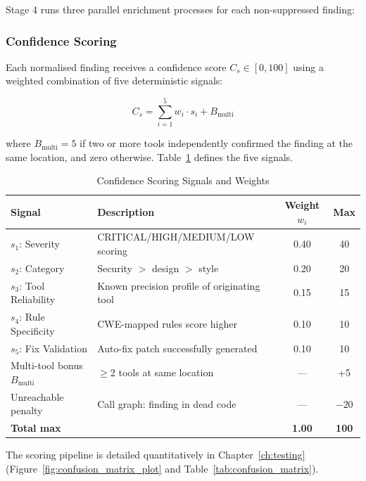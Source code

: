 Stage 4 runs three parallel enrichment processes for each non-suppressed finding:

\subsubsection{Confidence Scoring}

Each normalised finding receives a confidence score $C_s \in [0, 100]$ using a weighted combination of five deterministic signals:

\begin{equation}
  C_s = \sum_{i=1}^{5} w_i \cdot s_i + B_{\text{multi}}
  \label{eq:confidence_score}
\end{equation}

\noindent where $B_{\text{multi}} = 5$ if two or more tools independently confirmed the finding at the same location, and zero otherwise. Table~\ref{tab:confidence_signals} defines the five signals.

\begin{table}[htbp]
\caption{Confidence Scoring Signals and Weights}
\label{tab:confidence_signals}
\centering
\renewcommand{\arraystretch}{1.3}
\begin{tabularx}{\textwidth}{@{} l X c c @{}}
\toprule
\textbf{Signal} & \textbf{Description} & \textbf{Weight $w_i$} & \textbf{Max} \\
\midrule
$s_1$: Severity         & CRITICAL/HIGH/MEDIUM/LOW scoring           & 0.40 & 40 \\
$s_2$: Category         & Security $>$ design $>$ style              & 0.20 & 20 \\
$s_3$: Tool Reliability & Known precision profile of originating tool & 0.15 & 15 \\
$s_4$: Rule Specificity & CWE-mapped rules score higher              & 0.10 & 10 \\
$s_5$: Fix Validation   & Auto-fix patch successfully generated      & 0.10 & 10 \\
\midrule
Multi-tool bonus $B_{\text{multi}}$ & $\geq$2 tools at same location & --- & +5 \\
Unreachable penalty  & Call graph: finding in dead code            & --- & $-20$ \\
\midrule
\textbf{Total max} & & \textbf{1.00} & \textbf{100} \\
\bottomrule
\end{tabularx}
\end{table}

The scoring pipeline is detailed quantitatively in Chapter~\ref{ch:testing} (Figure~\ref{fig:confusion_matrix_plot} and Table~\ref{tab:confusion_matrix}).

